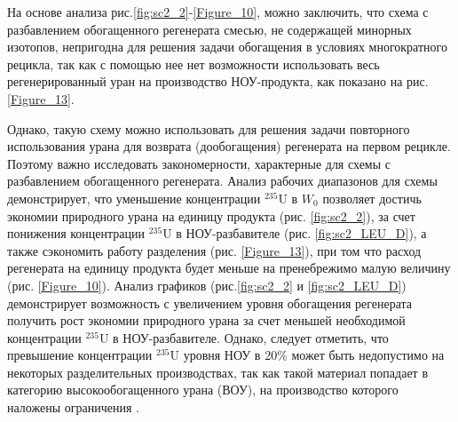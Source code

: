 

На основе анализа рис.\ref{fig:sc2_2}-\ref{Figure_10}, можно заключить, что схема с разбавлением обогащенного регенерата смесью, не содержащей минорных изотопов, непригодна для решения задачи обогащения в условиях многократного рецикла, так как с помощью нее нет возможности использовать весь регенерированный уран на производство НОУ-продукта, как показано на рис. \ref{Figure_13}.

Однако, такую схему можно использовать для решения задачи повторного использования урана для возврата (дообогащения) регенерата на первом рецикле. Поэтому важно исследовать закономерности, характерные для схемы с разбавлением обогащенного регенерата.
Анализ рабочих диапазонов для схемы демонстрирует, что уменьшение концентрации $^{235}$U в $W_0$ позволяет достичь экономии природного урана на единицу продукта (рис. \ref{fig:sc2_2}), за счет понижения концентрации $^{235}$U в НОУ-разбавителе (рис. \ref{fig:sc2_LEU_D}), а также сэкономить работу разделения (рис. \ref{Figure_13}), при том что расход регенерата на единицу продукта будет меньше на пренебрежимо малую величину (рис. \ref{Figure_10}). Анализ графиков (рис.\ref{fig:sc2_2} и \ref{fig:sc2_LEU_D}) демонстрирует возможность с увеличением уровня обогащения регенерата получить рост экономии природного урана за счет меньшей необходимой концентрации $^{235}$U в НОУ-разбавителе. Однако, следует отметить, что превышение концентрации $^{235}$U уровня НОУ в 20\% может быть недопустимо на некоторых разделительных производствах, так как такой материал попадает в категорию высокообогащенного урана (ВОУ), на производство которого наложены ограничения \cite{gusevProliferationResistanceAnalysis2019}.



